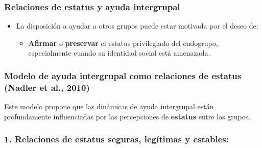 \documentclass[
]{book}
\providecommand{\tightlist}{%
  \setlength{\itemsep}{0pt}\setlength{\parskip}{0pt}}
\begin{document}
\subsubsection{Relaciones de estatus y ayuda intergrupal}\label{relaciones-de-estatus-y-ayuda-intergrupal}

\begin{itemize}
\tightlist
\item
  La disposición a ayudar a otros grupos puede estar motivada por el deseo de:

  \begin{itemize}
  \tightlist
  \item
    \textbf{Afirmar} o \textbf{preservar} el estatus privilegiado del endogrupo, especialmente cuando su identidad social está amenazada.
  \end{itemize}
\end{itemize}

\subsubsection{Modelo de ayuda intergrupal como relaciones de estatus (Nadler et al., 2010)}\label{modelo-de-ayuda-intergrupal-como-relaciones-de-estatus-nadler-et-al.-2010}

Este modelo propone que las dinámicas de ayuda intergrupal están profundamente influenciadas por las percepciones de \textbf{estatus} entre los grupos.

\subsubsection{\texorpdfstring{\textbf{1. Relaciones de estatus seguras, legítimas y estables:}}{1. Relaciones de estatus seguras, legítimas y estables:}}\label{relaciones-de-estatus-seguras-leguxedtimas-y-estables}
\end{document}
